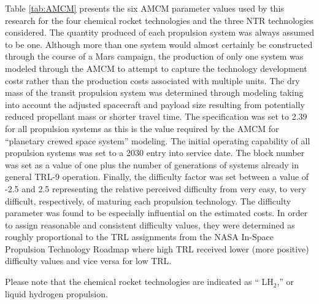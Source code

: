 \documentclass[]{aiaa-pretty}
\begin{document}
Table  \ref{tab:AMCM} presents the six AMCM parameter values used by this research for the four chemical rocket technologies and the three NTR technologies considered. The quantity produced of each propulsion system was always assumed to be one. Although more than one system would almost certainly be constructed through the course of a Mars campaign, the production of only one system was modeled through the AMCM to attempt to capture the technology development costs rather than the production costs associated with multiple units. The dry mass of the transit propulsion system was determined through modeling taking into account the adjusted spacecraft and payload size resulting from potentially reduced propellant mass or shorter travel time. The specification was set to 2.39 for all propulsion systems as this is the value required by the AMCM for “planetary crewed space system” modeling. The initial operating capability of all propulsion systems was set to a 2030 entry into service date. The block number was set as a value of one plus the number of generations of systems already in general TRL-9 operation. Finally, the difficulty factor was set between a value of -2.5 and 2.5 representing the relative perceived difficulty from very easy, to very difficult, respectively, of maturing each propulsion technology. The difficulty parameter was found to be especially influential on the estimated costs. In order to assign reasonable and consistent difficulty values, they were determined as roughly proportional to the TRL assignments from the NASA In-Space Propulsion Technology Roadmap where high TRL received lower (more positive) difficulty values and vice versa for low TRL. \cite{nasa2015techroadmap}

Please note that the chemical rocket technologies are indicated as “ LH$_2$,” or liquid hydrogen propulsion.
\end{document}
